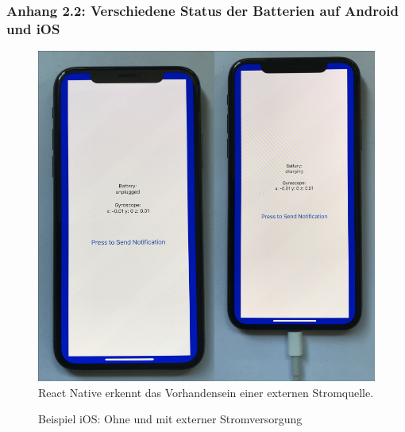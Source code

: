 \documentclass[a4paper]{scrartcl}
\begin{document}
\newpage

\subsubsection*{Anhang 2.2: Verschiedene Status der Batterien auf Android und iOS}

\begin{figure}[H]
	\centering
	\caption{Beispiel iOS: Ohne und mit externer Stromversorgung}
	\includegraphics[scale=0.3]{_assets/iOS_unpugged_charging.png} \\
	React Native erkennt das Vorhandensein einer externen Stromquelle. 
\end{figure}
\end{document}
